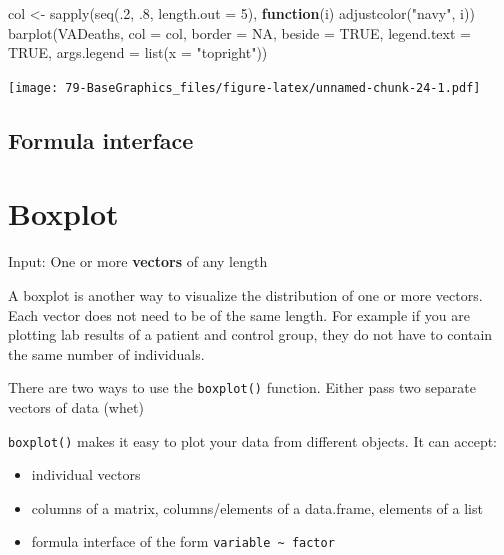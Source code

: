 \documentclass[
]{book}
\newenvironment{Shaded}{\begin{snugshade}}{\end{snugshade}}
\newcommand{\AttributeTok}[1]{\textcolor[rgb]{0.77,0.63,0.00}{#1}}
\newcommand{\ConstantTok}[1]{\textcolor[rgb]{0.00,0.00,0.00}{#1}}
\newcommand{\ControlFlowTok}[1]{\textcolor[rgb]{0.13,0.29,0.53}{\textbf{#1}}}
\newcommand{\DecValTok}[1]{\textcolor[rgb]{0.00,0.00,0.81}{#1}}
\newcommand{\FunctionTok}[1]{\textcolor[rgb]{0.00,0.00,0.00}{#1}}
\newcommand{\NormalTok}[1]{#1}
\newcommand{\OtherTok}[1]{\textcolor[rgb]{0.56,0.35,0.01}{#1}}
\newcommand{\StringTok}[1]{\textcolor[rgb]{0.31,0.60,0.02}{#1}}
\providecommand{\tightlist}{%
  \setlength{\itemsep}{0pt}\setlength{\parskip}{0pt}}
\begin{document}
\begin{Shaded}
\begin{Highlighting}[]
\NormalTok{col }\OtherTok{\textless{}{-}} \FunctionTok{sapply}\NormalTok{(}\FunctionTok{seq}\NormalTok{(.}\DecValTok{2}\NormalTok{, .}\DecValTok{8}\NormalTok{, }\AttributeTok{length.out =} \DecValTok{5}\NormalTok{), }\ControlFlowTok{function}\NormalTok{(i) }\FunctionTok{adjustcolor}\NormalTok{(}\StringTok{"navy"}\NormalTok{, i))}
\FunctionTok{barplot}\NormalTok{(VADeaths,}
        \AttributeTok{col =}\NormalTok{ col,}
        \AttributeTok{border =} \ConstantTok{NA}\NormalTok{,}
        \AttributeTok{beside =} \ConstantTok{TRUE}\NormalTok{,}
        \AttributeTok{legend.text =} \ConstantTok{TRUE}\NormalTok{, }\AttributeTok{args.legend =} \FunctionTok{list}\NormalTok{(}\AttributeTok{x =} \StringTok{"topright"}\NormalTok{))}
\end{Highlighting}
\end{Shaded}

\texttt{[image: 79-BaseGraphics\_files/figure-latex/unnamed-chunk-24-1.pdf]}

\hypertarget{formula-interface}{%
\subsection{Formula interface}\label{formula-interface}}

\hypertarget{boxplot}{%
\section{Boxplot}\label{boxplot}}

Input: One or more \textbf{vectors} of any length

A boxplot is another way to visualize the distribution of one or more vectors. Each vector does not need to be of the same length. For example if you are plotting lab results of a patient and control group, they do not have to contain the same number of individuals.

There are two ways to use the \texttt{boxplot()} function. Either pass two separate vectors of data (whet)

\texttt{boxplot()} makes it easy to plot your data from different objects. It can accept:

\begin{itemize}
\tightlist
\item
  individual vectors
\item
  columns of a matrix, columns/elements of a data.frame, elements of a list
\item
  formula interface of the form \texttt{variable\ \textasciitilde{}\ factor}
\end{itemize}
\end{document}
